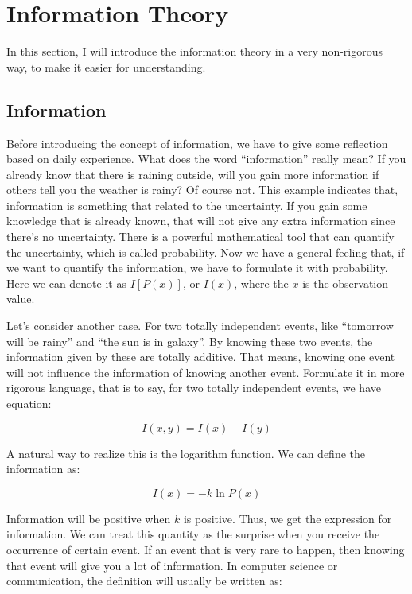 \documentclass[../main.tex]{subfiles}
\begin{document}
\section{\textbf{Information Theory}}

In this section, I will introduce the information theory in a very non-rigorous way, to make it easier for understanding.

\subsection{Information}
Before introducing the concept of information, we have to give some reflection based on daily experience. What does the word ``information'' really mean? If you already know that there is raining outside, will you gain more information if others tell you the weather is rainy? Of course not. This example indicates that, information is something that related to the uncertainty. If you gain some knowledge that is already known, that will not give any extra information since there's no uncertainty. There is a powerful mathematical tool that can quantify the uncertainty, which is called probability. Now we have a general feeling that, if we want to quantify the information, we have to formulate it with probability. Here we can denote it as $I[P(x)]$, or $I(x)$, where the $x$ is the observation value. 

Let's consider another case. For two totally independent events, like ``tomorrow will be rainy'' and ``the sun is in galaxy''. By knowing these two events, the information given by these are totally additive. That means, knowing one event will not influence the information of knowing another event. Formulate it in more rigorous language, that is to say, for two totally independent events, we have equation: 

\begin{equation}
    I(x, y) = I(x) + I(y)
\end{equation}

A natural way to realize this is the logarithm function. We can define the information as:

\begin{equation}
    I(x) = -k\ln P(x)
\end{equation}

Information will be positive when $k$ is positive. Thus, we get the expression for information. We can treat this quantity as the surprise when you receive the occurrence of certain event. If an event that is very rare to happen, then knowing that event will give you a lot of information. In computer science or communication, the definition will usually be written as:
\end{document}
